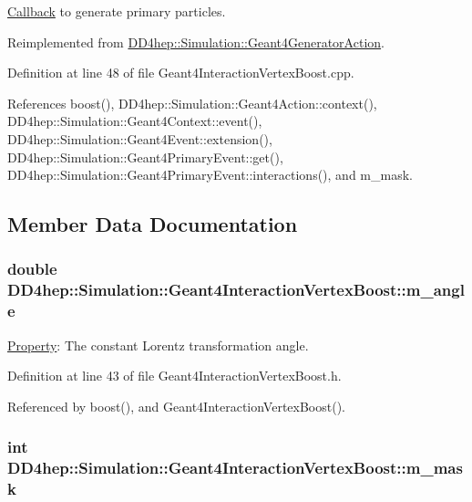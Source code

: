 \hyperlink{class_d_d4hep_1_1_callback}{Callback} to generate primary particles. 

Reimplemented from \hyperlink{class_d_d4hep_1_1_simulation_1_1_geant4_generator_action_ac5a1d2335a19e3f9d555081199e01801}{DD4hep::Simulation::Geant4GeneratorAction}.

Definition at line 48 of file Geant4InteractionVertexBoost.cpp.

References boost(), DD4hep::Simulation::Geant4Action::context(), DD4hep::Simulation::Geant4Context::event(), DD4hep::Simulation::Geant4Event::extension(), DD4hep::Simulation::Geant4PrimaryEvent::get(), DD4hep::Simulation::Geant4PrimaryEvent::interactions(), and m\_\-mask.

\subsection{Member Data Documentation}
\hypertarget{class_d_d4hep_1_1_simulation_1_1_geant4_interaction_vertex_boost_a545bdd5e80a80a03f613c7f9bd2e3c6c}{
\subsubsection[{m\_\-angle}]{\setlength{\rightskip}{0pt plus 5cm}double {\bf DD4hep::Simulation::Geant4InteractionVertexBoost::m\_\-angle}}}
\label{class_d_d4hep_1_1_simulation_1_1_geant4_interaction_vertex_boost_a545bdd5e80a80a03f613c7f9bd2e3c6c}


\hyperlink{class_d_d4hep_1_1_property}{Property}: The constant Lorentz transformation angle. 

Definition at line 43 of file Geant4InteractionVertexBoost.h.

Referenced by boost(), and Geant4InteractionVertexBoost().\hypertarget{class_d_d4hep_1_1_simulation_1_1_geant4_interaction_vertex_boost_a6627def92b1b92c93ad455853c65f3c3}{
\subsubsection[{m\_\-mask}]{\setlength{\rightskip}{0pt plus 5cm}int {\bf DD4hep::Simulation::Geant4InteractionVertexBoost::m\_\-mask}}}
\label{class_d_d4hep_1_1_simulation_1_1_geant4_interaction_vertex_boost_a6627def92b1b92c93ad455853c65f3c3}


